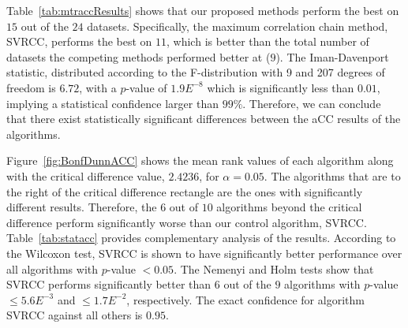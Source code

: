 \documentclass[reqno]{vcuthesis}
\numberwithin{equation}{chapter}
\begin{document}
Table~{\ref{tab:mtraccResults}} shows that our proposed methods perform the best on $15$ out of the $24$ datasets. Specifically, the maximum correlation chain method, SVRCC, performs the best on $11$, which is better than the total number of datasets the competing methods performed better at ($9$). The Iman-Davenport statistic, distributed according to the F-distribution with 9 and 207 degrees of freedom is $6.72$, with a $p$-value of $1.9E^{-8}$ which is significantly less than $0.01$, implying a statistical confidence larger than $99\%$. Therefore, we can conclude that there exist statistically significant differences between the aCC results of the algorithms.

Figure~{\ref{fig:BonfDunnACC}} shows the mean rank values of each algorithm along with the critical difference value, $2.4236$, for $\alpha = 0.05$. The algorithms that are to the right of the critical difference rectangle are the ones with significantly different results. Therefore, the $6$ out of $10$ algorithms beyond the critical difference perform significantly worse than our control algorithm, SVRCC. Table~{\ref{tab:statacc}} provides complementary analysis of the results. According to the Wilcoxon test, SVRCC is shown to have significantly better performance over all algorithms with $p$-value $< 0.05$. The Nemenyi and Holm tests show that SVRCC performs significantly better than $6$ out of the $9$ algorithms with $p$-value $\leq 5.6E^{-3}$ and $\leq 1.7E^{-2}$, respectively. The exact confidence for algorithm SVRCC against all others is $0.95$.
\end{document}
